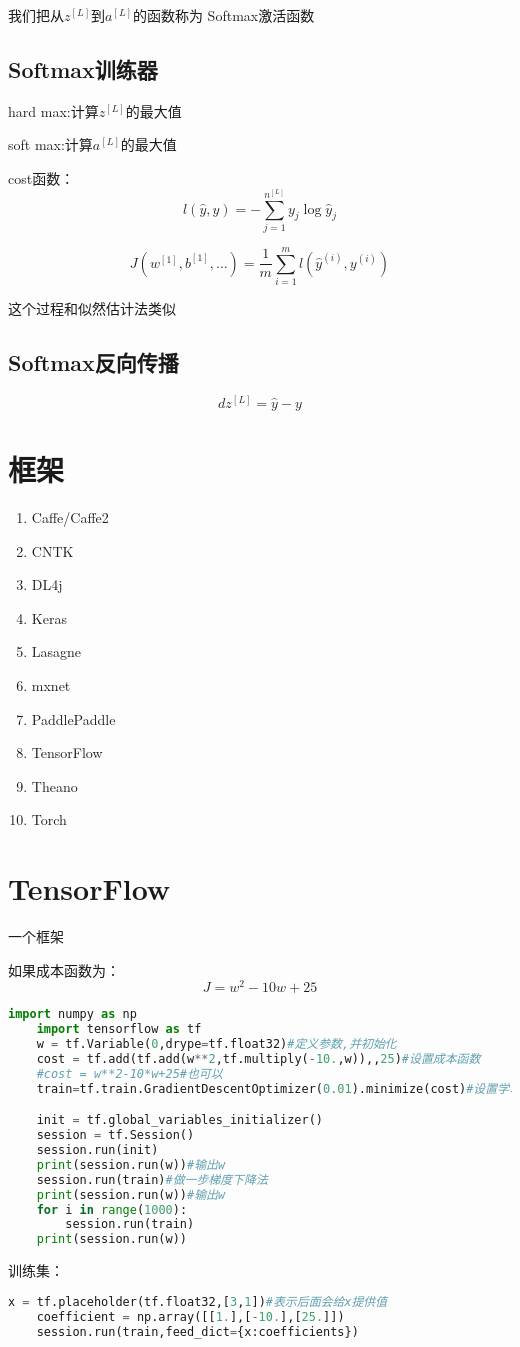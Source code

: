 \documentclass[UTF8]{ctexrep}
\begin{document}
我们把从$z^{[L]}$到$a^{[L]}$的函数称为 Softmax激活函数
\subsection{Softmax训练器}
hard max:计算$z^{[L]}$的最大值

soft max:计算$a^{[L]}$的最大值

cost函数：
$$l(\hat y,y)=-\sum_{j=1}^{n^{[L]}}y_j\log\hat y_j$$

$$J(w^{[1]},b^{[1]},\dots)=\frac1m\sum_{i=1}^ml(\hat y^{(i)},y^{(i)})$$

这个过程和似然估计法类似

\subsection{Softmax反向传播}
$$dz^{[L]}=\hat y-y$$
\section{框架}

\begin{enumerate}
    \item Caffe/Caffe2
    \item CNTK
    \item DL4j
    \item Keras
    \item Lasagne
    \item mxnet
    \item PaddlePaddle
    \item TensorFlow
    \item Theano
    \item Torch
\end{enumerate}

\section{TensorFlow}
一个框架

如果成本函数为：
$$J=w^2-10w+25$$

\begin{lstlisting}[language = python]
    import numpy as np
    import tensorflow as tf
    w = tf.Variable(0,drype=tf.float32)#定义参数,并初始化
    cost = tf.add(tf.add(w**2,tf.multiply(-10.,w)),,25)#设置成本函数
    #cost = w**2-10*w+25#也可以
    train=tf.train.GradientDescentOptimizer(0.01).minimize(cost)#设置学习率，使用梯度下降法

    init = tf.global_variables_initializer()
    session = tf.Session()
    session.run(init)
    print(session.run(w))#输出w
    session.run(train)#做一步梯度下降法
    print(session.run(w))#输出w
    for i in range(1000):
        session.run(train)
    print(session.run(w))
\end{lstlisting}

训练集：
\begin{lstlisting}[language = python]
    x = tf.placeholder(tf.float32,[3,1])#表示后面会给x提供值
    coefficient = np.array([[1.],[-10.],[25.]])
    session.run(train,feed_dict={x:coefficients})
\end{lstlisting}
\end{document}
